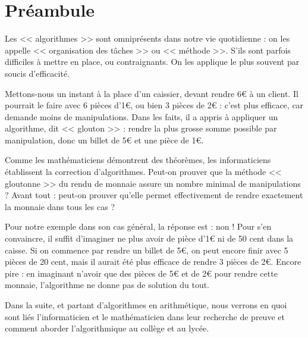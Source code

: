 \chapter{Préambule}
Les << algorithmes >> sont omniprésents dans notre vie quotidienne : on les appelle << organisation des tâches >> ou << méthode >>. S'ils sont parfois difficiles à mettre en place, ou contraignants. On les applique le plus souvent par soucis d'efficacité.

Mettons-nous un instant à la place d'un caissier, devant rendre 6€ à un client. Il pourrait le faire avec 6 pièces d'1€, ou bien 3 pièces de 2€ : c'est plus efficace, car demande moins de manipulations. Dans les faits, il a appris à appliquer un algorithme, dit << glouton >> : rendre la plus grosse somme possible par manipulation, donc un billet de 5€ et une pièce de 1€.

Comme les mathématiciens démontrent des théorèmes, les informaticiens établissent la correction d'algorithmes. Peut-on prouver que la méthode << gloutonne >> du rendu de monnaie assure un nombre minimal de manipulations ? Avant tout : peut-on prouver qu'elle permet effectivement de rendre exactement la monnaie dans tous les cas ?

Pour notre exemple dans son cas général, la réponse est : non ! Pour s'en convaincre, il suffit d'imaginer ne plus avoir de pièce d'1€ ni de 50 cent dans la caisse. Si on commence par rendre un billet de 5€, on peut encore finir avec 5 pièces de 20 cent, mais il aurait été plus efficace de rendre 3 pièces de 2€. Encore pire : en imaginant n'avoir que des pièces de 5€ et de 2€ pour rendre cette monnaie, l'algorithme ne donne pas de solution du tout.

Dans la suite, et partant d'algorithmes en arithmétique, nous verrons en quoi sont liés l'informaticien et le mathématicien dans leur recherche de preuve et comment aborder l'algorithmique au collège et au lycée.